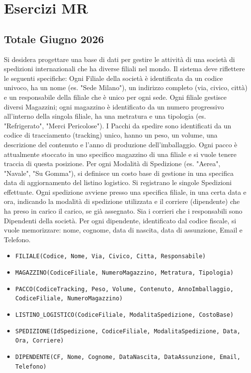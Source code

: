 \chapter{Esercizi MR}
\section{Totale Giugno 2026}
Si desidera progettare una base di dati per gestire le attività di una società di spedizioni internazionali che ha diverse filiali nel mondo. Il sistema deve riflettere le seguenti specifiche: Ogni Filiale della società è identificata da un codice univoco, ha un nome (es. "Sede Milano"), un indirizzo completo (via, civico, città) e un responsabile della filiale che è unico per ogni sede. Ogni filiale gestisce diversi Magazzini; ogni magazzino è identificato da un numero progressivo all'interno della singola filiale, ha una metratura e una tipologia (es. "Refrigerato", "Merci Pericolose"). I Pacchi da spedire sono identificati da un codice di tracciamento (tracking) unico, hanno un peso, un volume, una descrizione del contenuto e l'anno di produzione dell'imballaggio. Ogni pacco è attualmente stoccato in uno specifico magazzino di una filiale e si vuole tenere traccia di questa posizione. Per ogni Modalità di Spedizione (es. "Aerea", "Navale", "Su Gomma"), si definisce un costo base di gestione in una specifica data di aggiornamento del listino logistico. Si registrano le singole Spedizioni effettuate. Ogni spedizione avviene presso una specifica filiale, in una certa data e ora, indicando la modalità di spedizione utilizzata e il corriere (dipendente) che ha preso in carico il carico, se già assegnato.
Sia i corrieri che i responsabili sono Dipendenti della società. Per ogni dipendente, identificato dal codice fiscale, si vuole memorizzare: nome, cognome, data di nascita, data di assunzione, Email e Telefono.


\begin{itemize}
    \item \texttt{FILIALE(Codice, Nome, Via, Civico, Citta, Responsabile)}
    \item \texttt{MAGAZZINO(CodiceFiliale, NumeroMagazzino, Metratura, Tipologia)}
    \item \texttt{PACCO(CodiceTracking, Peso, Volume, Contenuto, AnnoImballaggio, CodiceFiliale, NumeroMagazzino)}
    \item \texttt{LISTINO\_LOGISTICO(CodiceFiliale, ModalitaSpedizione, CostoBase)}
    \item \texttt{SPEDIZIONE(IdSpedizione, CodiceFiliale, ModalitaSpedizione, Data, Ora, Corriere)}
    \item \texttt{DIPENDENTE(CF, Nome, Cognome, DataNascita, DataAssunzione, Email, Telefono)}
\end{itemize}

